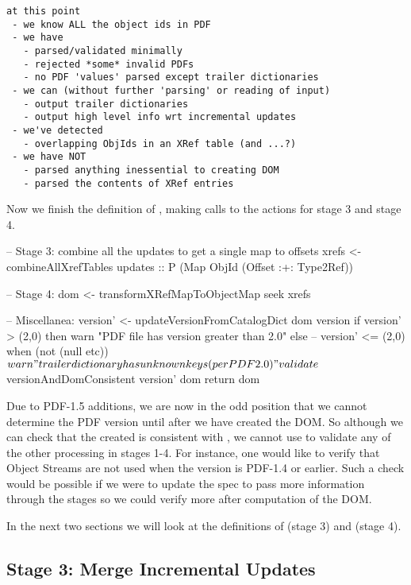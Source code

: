 \begin{lstlisting}[style=meta]
at this point
 - we know ALL the object ids in PDF
 - we have
   - parsed/validated minimally
   - rejected *some* invalid PDFs
   - no PDF 'values' parsed except trailer dictionaries
 - we can (without further 'parsing' or reading of input)
   - output trailer dictionaries
   - output high level info wrt incremental updates
 - we've detected
   - overlapping ObjIds in an XRef table (and ...?)
 - we have NOT
   - parsed anything inessential to creating DOM
   - parsed the contents of XRef entries
\end{lstlisting}

Now we finish the definition of , making calls
to the actions for stage 3 and stage 4.

\begin{code}  
    -- Stage 3: combine all the updates to get a single map to offsets
    xrefs <- combineAllXrefTables updates
             :: P (Map ObjId (Offset :+: Type2Ref))

    -- Stage 4:
    dom <- transformXRefMapToObjectMap seek xrefs
    
    -- Miscellanea:
    version' <- updateVersionFromCatalogDict dom version
    if version' > (2,0) then
      warn "PDF file has version greater than 2.0"
    else
      -- version' <= (2,0)
      when (not (null etc)) $
        warn "trailer dictionary has unknown keys (per PDF 2.0)"
    validate $
      versionAndDomConsistent version' dom
    return dom
\end{code}

Due to PDF-1.5 additions, we are now in the odd position that we
cannot determine the PDF version until after we have created the DOM.
So although we
can check that the created  is consistent with
,
% 
we cannot use  to validate any of the other processing
in stages 1-4.
%
For instance, one would like to verify that Object Streams are not
used when the version is PDF-1.4 or earlier.
%
Such a check would be possible if we were to update the spec to pass
more information through the stages so we could verify more after
computation of the DOM.

In the next two sections we will look at the definitions of
 (stage 3) and
 (stage 4).

\subsection{Stage 3: Merge Incremental Updates}

